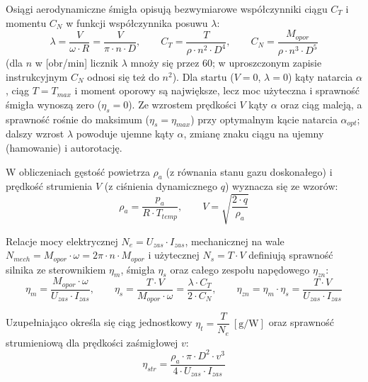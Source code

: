 \akapit Osiągi aerodynamiczne śmigła opisują bezwymiarowe współczynniki ciągu $C_T$ i momentu $C_N$ w funkcji współczynnika posuwu $\lambda$:
\[
\lambda = \frac{V}{\omega \cdot R} = \frac{V}{\pi \cdot n \cdot D}, \qquad
C_T = \frac{T}{\rho \cdot n^2 \cdot D^4}, \qquad
C_N = \frac{M_{opor}}{\rho \cdot n^3 \cdot D^5}
\]
(dla $n$ w [obr/min] licznik $\lambda$ mnoży się przez 60; w uproszczonym zapisie instrukcyjnym $C_N$ odnosi się też do $n^2$). Dla startu ($V = 0$, $\lambda = 0$) kąty natarcia $\alpha$, ciąg $T = T_{max}$ i moment oporowy są największe, lecz moc użyteczna i sprawność śmigła wynoszą zero ($\eta_s = 0$). Ze wzrostem prędkości $V$ kąty $\alpha$ oraz ciąg maleją, a sprawność rośnie do maksimum ($\eta_s = \eta_{max}$) przy optymalnym kącie natarcia $\alpha_{opt}$; dalszy wzrost $\lambda$ powoduje ujemne kąty $\alpha$, zmianę znaku ciągu na ujemny (hamowanie) i autorotację.

\akapit W obliczeniach gęstość powietrza $\rho_a$ (z równania stanu gazu doskonałego) i prędkość strumienia $V$ (z ciśnienia dynamicznego $q$) wyznacza się ze wzorów:
\[
\rho_a = \frac{p_a}{R \cdot T_{temp}}, \qquad V = \sqrt{\frac{2 \cdot q}{\rho_a}}
\]

\akapit Relacje mocy elektrycznej $N_e = U_{zas} \cdot I_{zas}$, mechanicznej na wale $N_{mech} = M_{opor} \cdot \omega = 2\pi \cdot n \cdot M_{opor}$ i użytecznej $N_s = T \cdot V$ definiują sprawność silnika ze sterownikiem $\eta_m$, śmigła $\eta_s$ oraz całego zespołu napędowego $\eta_{zn}$:
\[
\eta_m = \frac{M_{opor} \cdot \omega}{U_{zas} \cdot I_{zas}}, \qquad
\eta_s = \frac{T \cdot V}{M_{opor} \cdot \omega} = \frac{\lambda \cdot C_T}{2 \cdot C_N}, \qquad
\eta_{zn} = \eta_m \cdot \eta_s = \frac{T \cdot V}{U_{zas} \cdot I_{zas}}
\]

\akapit Uzupełniająco określa się ciąg jednostkowy
$\eta_t = \dfrac{T}{N_e}\ [\mathrm{g/W}]$
oraz sprawność strumieniową dla prędkości zaśmigłowej $v$:
\[
\eta_{str} = \frac{\rho_a \cdot \pi \cdot D^2 \cdot v^3}{4 \cdot U_{zas} \cdot I_{zas}}
\]
